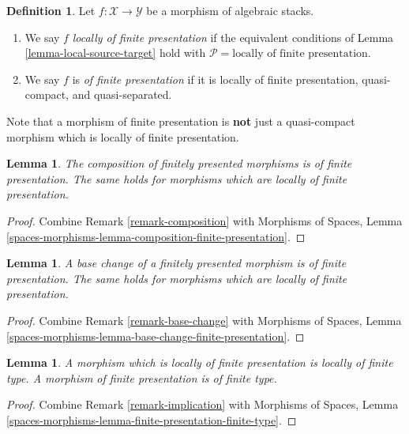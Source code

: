 \documentclass{stacks-project}
\theoremstyle{plain}
\newtheorem{lemma}[subsection]{Lemma}
\theoremstyle{definition}
\newtheorem{definition}[subsection]{Definition}
\theoremstyle{remark}
\numberwithin{equation}{subsection}
\begin{document}
\begin{definition}
\label{definition-locally-finite-presentation}
Let $f : \mathcal{X} \to \mathcal{Y}$ be a morphism of algebraic stacks.
\begin{enumerate}
\item We say $f$
{\it locally of finite presentation} if the equivalent conditions of
Lemma \ref{lemma-local-source-target}
hold with
$\mathcal{P} = \text{locally of finite presentation}$.
\item We say $f$ is
{\it of finite presentation} if it is locally of finite presentation,
quasi-compact, and quasi-separated.
\end{enumerate}
\end{definition}

\noindent
Note that a morphism of finite presentation is {\bf not} just a quasi-compact
morphism which is locally of finite presentation.

\begin{lemma}
\label{lemma-composition-finite-presentation}
The composition of finitely presented morphisms is of finite presentation.
The same holds for morphisms which are locally of finite presentation.
\end{lemma}

\begin{proof}
Combine
Remark \ref{remark-composition}
with
Morphisms of Spaces, Lemma
\ref{spaces-morphisms-lemma-composition-finite-presentation}.
\end{proof}

\begin{lemma}
\label{lemma-base-change-finite-presentation}
A base change of a finitely presented morphism is of finite presentation.
The same holds for morphisms which are locally of finite presentation.
\end{lemma}

\begin{proof}
Combine
Remark \ref{remark-base-change}
with
Morphisms of Spaces, Lemma
\ref{spaces-morphisms-lemma-base-change-finite-presentation}.
\end{proof}

\begin{lemma}
\label{lemma-finite-presentation-finite-type}
A morphism which is locally of finite presentation is locally of finite type.
A morphism of finite presentation is of finite type.
\end{lemma}

\begin{proof}
Combine
Remark \ref{remark-implication}
with
Morphisms of Spaces, Lemma
\ref{spaces-morphisms-lemma-finite-presentation-finite-type}.
\end{proof}
\end{document}
